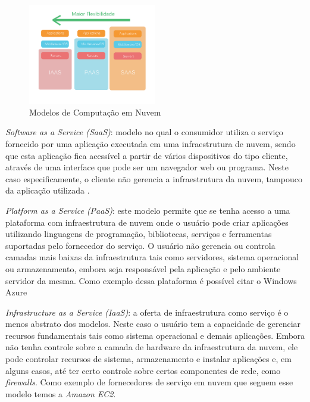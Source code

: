 \begin{figure}[htb]
	\caption{\label{fig:cloud_en}Modelos de Computação em Nuvem}
	\begin{center}
		\includegraphics[width=0.50\textwidth]{img/cloud_en.png}
	\end{center}
\end{figure}


\textit{Software as a Service (SaaS)}: modelo no qual o consumidor utiliza o serviço fornecido por uma aplicação executada em uma infraestrutura de nuvem, sendo que esta aplicação fica acessível a partir de vários dispositivos do tipo cliente, através de uma interface que pode ser um navegador web ou programa. Neste caso especificamente, o cliente não gerencia a infraestrutura da nuvem, tampouco da aplicação utilizada \cite{mell2011nist}. 

\textit{Platform as a Service (PaaS)}: este modelo permite que se tenha acesso a uma plataforma com infraestrutura de nuvem onde o usuário pode criar aplicações utilizando linguagens de programação, bibliotecas, serviços e ferramentas suportadas pelo fornecedor do serviço. O usuário não gerencia ou controla camadas mais baixas da infraestrutura tais como servidores, sistema operacional ou armazenamento, embora seja responsável pela aplicação e pelo ambiente servidor da mesma\cite{mell2011nist}. Como exemplo dessa plataforma é possível citar o Windows Azure \cite{Azure}

\textit{Infrastructure as a Service (IaaS)}: a oferta de infraestrutura como serviço é o menos abstrato dos modelos. Neste caso o usuário tem a capacidade de gerenciar recursos fundamentais tais como sistema operacional e demais aplicações. Embora não tenha controle sobre a camada de hardware da infraestrutura da nuvem, ele pode controlar recursos de sistema, armazenamento e instalar aplicações e, em alguns casos, até ter certo controle sobre certos componentes de rede, como \textit{firewalls}\cite{zhang2010cloud}. Como exemplo de fornecedores de serviço em nuvem que seguem esse modelo temos a \textit{Amazon EC2}\cite{AmazonEC2}. 

